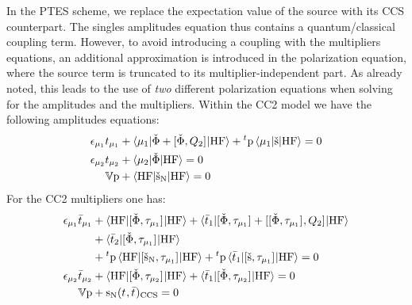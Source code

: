In the \acrshort{PTES} scheme, we replace the expectation value of the
source with its \acrshort{CCS} counterpart. The singles amplitudes equation
thus contains a quantum/classical coupling term. However, to avoid
introducing a coupling with the multipliers equations, an additional
approximation is introduced in the polarization equation, where the
source term is truncated to its multiplier-independent part.
As already noted, this leads to the use of \emph{two} different
polarization equations when solving for the amplitudes and the
multipliers.
Within the \acrshort{CC2} model we have the following amplitudes
equations:
\begin{subequations}\label{eq:ptes-cc2-amp}
  \begin{align}
   \epsilon_{\mu_1}t_{\mu_1} &+ \braket{\mu_1 | \check{\Phi} +
   [ \check{\Phi}, Q_2 ]^{} | \mathrm{HF}}
   + {}^t\mathrm{p}\braket{\mu_1 | \check{\mathrm{s}} | \mathrm{HF}}
             = 0 \label{eq:ptes-cc2-singles-amplitudes} \\
   \epsilon_{\mu_2}t_{\mu_2} &+ \braket{\mu_2 | \check{\Phi} | \mathrm{HF}}
             = 0 \label{eq:ptes-cc2-doubles-amplitudes} \\
    \mathbb{V}\mathrm{p} &+
    \braket{\mathrm{HF} | \check{\mathrm{s}}_{\mathrm{N}} | \mathrm{HF}} = 0
  \end{align}
\end{subequations}
For the \acrshort{CC2} multipliers one has:
\begin{subequations}\label{eq:ptes-cc2-mult}
  \begin{align}
    \epsilon_{\mu_1}\bar{t}_{\mu_1} &+
    \braket{\mathrm{HF} | [ \check{\Phi}, \tau_{\mu_1} ]^{} | \mathrm{HF}} +
    \braket{\bar{t}_{1} |
    [ \check{\Phi}, \tau_{\mu_1} ]^{}
    + [ [ \check{\Phi}, \tau_{\mu_1} ]^{}, Q_2 ]^{}
    | \mathrm{HF}}
    \nonumber \\
    &+ \braket{\bar{t}_{2} |
    [ \check{\Phi}, \tau_{\mu_1} ]^{}
    | \mathrm{HF}}
    \nonumber \\
    &+
    {}^t\mathrm{p}\braket{\mathrm{HF} | [ \check{\mathrm{s}}_\mathrm{N}, \tau_{\mu_1} ]^{} | \mathrm{HF}}
    +
    {}^t\mathrm{p}\braket{\bar{t}_{1} |
    [ \check{\mathrm{s}}, \tau_{\mu_1} ]^{} | \mathrm{HF}}
             = 0 \label{eq:ptes-cc2-singles-multipliers} \\
    \epsilon_{\mu_2}\bar{t}_{\mu_2} &+
    \braket{\mathrm{HF} | [ \check{\Phi}, \tau_{\mu_2} ]^{} | \mathrm{HF}} +
    \braket{\bar{t}_{1} |
    [ \check{\Phi}, \tau_{\mu_2} ]^{} | \mathrm{HF}}
             = 0 \label{eq:ptes-cc2-doubles-multipliers} \\
    \mathbb{V}\mathrm{p} &+ \mathrm{s}_{\mathrm{N}}(t_{}, \bar{t}_{})_\mathrm{CCS} = 0
    \label{eq:ptes-cc2-polarization-mult}
  \end{align}
\end{subequations}
